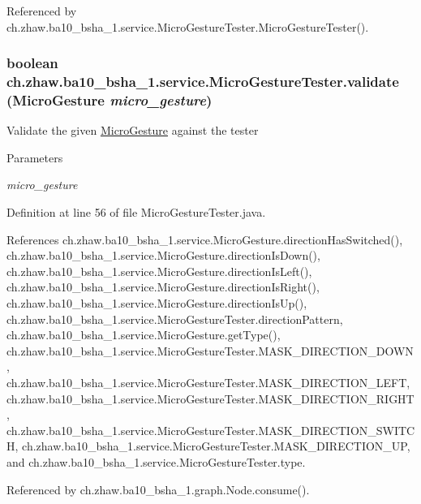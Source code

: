 Referenced by ch.zhaw.ba10\_\-bsha\_\-1.service.MicroGestureTester.MicroGestureTester().\hypertarget{classch_1_1zhaw_1_1ba10__bsha__1_1_1service_1_1MicroGestureTester_a0ec321204f2eb55d1fa0ce77a6df4654}{
\subsubsection[{validate}]{\setlength{\rightskip}{0pt plus 5cm}boolean ch.zhaw.ba10\_\-bsha\_\-1.service.MicroGestureTester.validate ({\bf MicroGesture} {\em micro\_\-gesture})}}
\label{classch_1_1zhaw_1_1ba10__bsha__1_1_1service_1_1MicroGestureTester_a0ec321204f2eb55d1fa0ce77a6df4654}
Validate the given \hyperlink{classch_1_1zhaw_1_1ba10__bsha__1_1_1service_1_1MicroGesture}{MicroGesture} against the tester


\begin{DoxyParams}{Parameters}
\item[{\em micro\_\-gesture}]\end{DoxyParams}


Definition at line 56 of file MicroGestureTester.java.

References ch.zhaw.ba10\_\-bsha\_\-1.service.MicroGesture.directionHasSwitched(), ch.zhaw.ba10\_\-bsha\_\-1.service.MicroGesture.directionIsDown(), ch.zhaw.ba10\_\-bsha\_\-1.service.MicroGesture.directionIsLeft(), ch.zhaw.ba10\_\-bsha\_\-1.service.MicroGesture.directionIsRight(), ch.zhaw.ba10\_\-bsha\_\-1.service.MicroGesture.directionIsUp(), ch.zhaw.ba10\_\-bsha\_\-1.service.MicroGestureTester.directionPattern, ch.zhaw.ba10\_\-bsha\_\-1.service.MicroGesture.getType(), ch.zhaw.ba10\_\-bsha\_\-1.service.MicroGestureTester.MASK\_\-DIRECTION\_\-DOWN, ch.zhaw.ba10\_\-bsha\_\-1.service.MicroGestureTester.MASK\_\-DIRECTION\_\-LEFT, ch.zhaw.ba10\_\-bsha\_\-1.service.MicroGestureTester.MASK\_\-DIRECTION\_\-RIGHT, ch.zhaw.ba10\_\-bsha\_\-1.service.MicroGestureTester.MASK\_\-DIRECTION\_\-SWITCH, ch.zhaw.ba10\_\-bsha\_\-1.service.MicroGestureTester.MASK\_\-DIRECTION\_\-UP, and ch.zhaw.ba10\_\-bsha\_\-1.service.MicroGestureTester.type.

Referenced by ch.zhaw.ba10\_\-bsha\_\-1.graph.Node.consume().

